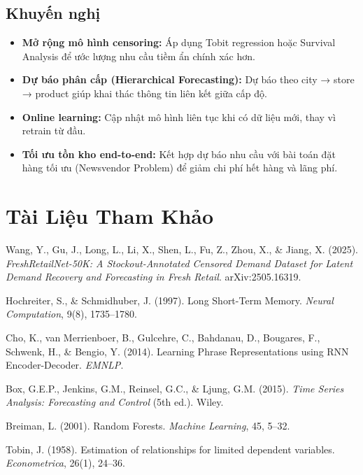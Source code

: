 \documentclass[12pt,a4paper]{report}
\begin{document}
\section{Khuyến nghị}

\begin{itemize}
    \item \textbf{Mở rộng mô hình censoring:} Áp dụng Tobit regression hoặc Survival Analysis để ước lượng nhu cầu tiềm ẩn chính xác hơn.
    \item \textbf{Dự báo phân cấp (Hierarchical Forecasting):} Dự báo theo city → store → product giúp khai thác thông tin liên kết giữa cấp độ.
    \item \textbf{Online learning:} Cập nhật mô hình liên tục khi có dữ liệu mới, thay vì retrain từ đầu.
    \item \textbf{Tối ưu tồn kho end-to-end:} Kết hợp dự báo nhu cầu với bài toán đặt hàng tối ưu (Newsvendor Problem) để giảm chi phí hết hàng và lãng phí.
\end{itemize}

\chapter*{Tài Liệu Tham Khảo}
\thispagestyle{fancy}

\begin{enumerate}[leftmargin=*, label={[\arabic*]}]
    \item Wang, Y., Gu, J., Long, L., Li, X., Shen, L., Fu, Z., Zhou, X., \& Jiang, X. (2025). \textit{FreshRetailNet-50K: A Stockout-Annotated Censored Demand Dataset for Latent Demand Recovery and Forecasting in Fresh Retail}. arXiv:2505.16319.

    \item Hochreiter, S., \& Schmidhuber, J. (1997). Long Short-Term Memory. \textit{Neural Computation}, 9(8), 1735--1780.

    \item Cho, K., van Merrienboer, B., Gulcehre, C., Bahdanau, D., Bougares, F., Schwenk, H., \& Bengio, Y. (2014). Learning Phrase Representations using RNN Encoder-Decoder. \textit{EMNLP}.

    \item Box, G.E.P., Jenkins, G.M., Reinsel, G.C., \& Ljung, G.M. (2015). \textit{Time Series Analysis: Forecasting and Control} (5th ed.). Wiley.

    \item Breiman, L. (2001). Random Forests. \textit{Machine Learning}, 45, 5--32.

    \item Tobin, J. (1958). Estimation of relationships for limited dependent variables. \textit{Econometrica}, 26(1), 24--36.

    \item [Thêm các tài liệu của từng thành viên tùy phần mình viết]
\end{enumerate}
\end{document}
